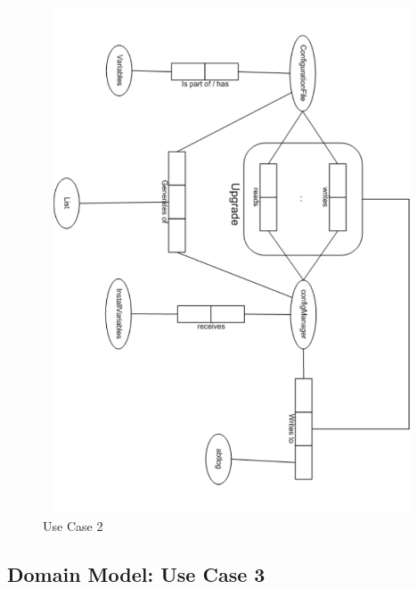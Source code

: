 \begin{figure}[htbp]
  \centering
  \includegraphics[angle=90,width=15cm,height=15cm]{"domainmodel-usecase2"}
  \caption{Use Case 2}
  \label{fig:usecase2}
\end{figure}

\newpage
\subsection{Domain Model: Use Case 3}

